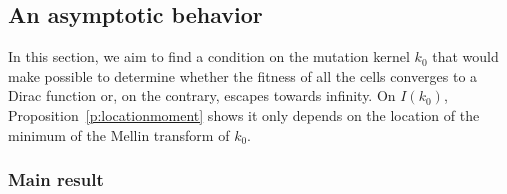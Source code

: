     \subsection{An asymptotic behavior}
    In this section, we aim to find a condition on the mutation kernel $k_0$ that would make possible to determine whether the fitness of all the cells converges to a Dirac function or, on the contrary, escapes towards infinity. On $I(k_0)$, Proposition~\ref{p:locationmoment} shows it only depends on the location of the minimum of the Mellin transform of $k_0$. 

        \subsubsection{Main result}

